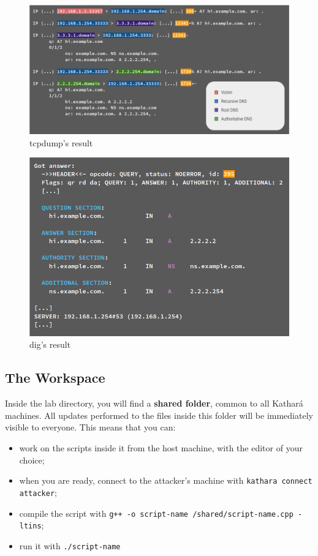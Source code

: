 \documentclass[11pt,a4paper]{article}
\begin{document}
\begin{figure}[h]
    \centering
    \includegraphics[width=\textwidth]{tcpdump-res.png}
    \caption{tcpdump's result}
    \label{fig:tcpdump-res}
\end{figure}

\begin{figure}[h]
    \centering
    \includegraphics[width=\textwidth]{dig-result.png}
    \caption{dig's result}
    \label{fig:dig-res}
\end{figure}

\subsection{The Workspace}

Inside the lab directory, you will find a \textbf{shared folder}, common to all Kathará
machines. All updates performed to the files inside this folder will be immediately visible
to everyone. This means that you can:
\begin{itemize}
    \item work on the scripts inside it from the host machine, with the editor of your choice;
    \item when you are ready, connect to the attacker's machine with \texttt{kathara connect attacker};
    \item compile the script with \texttt{g++ -o script-name /shared/script-name.cpp -ltins};
    \item run it with \texttt{./script-name}
\end{itemize}
\end{document}
